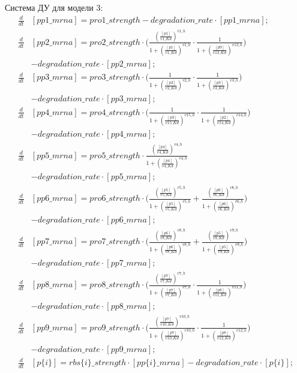 Система ДУ для модели 3:
\[ \begin{aligned}
  \frac{d}{dt}&[pp1\_mrna] = pro1\_strength - degradation\_rate \cdot [pp1\_mrna]; \\
  \frac{d}{dt}&[pp2\_mrna] = pro2\_strength \cdot 
    \biggl(\frac{(\frac{[p1]}{v1\_Kd})^{v1\_h}}{1+(\frac{[p1]}{v1\_Kd})^{v1\_h}} 
    \cdot \frac{1}{1+(\frac{[p9]}{v13\_Kd})^{v13\_h}}\biggr) \\
    & - degradation\_rate \cdot [pp2\_mrna]; \\
  \frac{d}{dt}&[pp3\_mrna] = pro3\_strength \cdot 
    \biggl(\frac{1}{1+(\frac{[p2]}{v2\_Kd})^{v2\_h}} 
    \cdot \frac{1}{1+(\frac{[p3]}{v3\_Kd})^{v3\_h}}\biggr) \\
    & - degradation\_rate \cdot [pp3\_mrna]; \\
  \frac{d}{dt}&[pp4\_mrna] = pro4\_strength \cdot 
    \biggl(\frac{1}{1+(\frac{[p3]}{v15\_Kd})^{v15\_h}} 
    \cdot \frac{1}{1+(\frac{[p2]}{v14\_Kd})^{v14\_h}}\biggr) \\
    & - degradation\_rate \cdot [pp4\_mrna]; \\
  \frac{d}{dt}&[pp5\_mrna] = pro5\_strength 
    \cdot \frac{(\frac{[p4]}{v4\_Kd})^{v4\_h}}{1+(\frac{[p4]}{v4\_Kd})^{v4\_h}} \\
    & - degradation\_rate \cdot [pp5\_mrna]; \\
  \frac{d}{dt}&[pp6\_mrna] = pro6\_strength \cdot 
    \biggl(\frac{(\frac{[p5]}{v5\_Kd})^{v5\_h}}{1+(\frac{[p5]}{v5\_Kd})^{v5\_h}} + 
    \frac{(\frac{[p6]}{v6\_Kd})^{v6\_h}}{1+(\frac{[p6]}{v6\_Kd})^{v6\_h}}\biggr) \\
    & - degradation\_rate \cdot [pp6\_mrna]; \\
  \frac{d}{dt}&[pp7\_mrna] = pro7\_strength \cdot 
    \biggl(\frac{(\frac{[p6]}{v8\_Kd})^{v8\_h}}{1+(\frac{[p6]}{v8\_Kd})^{v8\_h}} + 
    \frac{(\frac{[p5]}{v9\_Kd})^{v9\_h}}{1+(\frac{[p5]}{v9\_Kd})^{v9\_h}}\biggr) \\
    & - degradation\_rate \cdot [pp7\_mrna]; \\
  \frac{d}{dt}&[pp8\_mrna] = pro8\_strength \cdot 
    \biggl(\frac{(\frac{[p7]}{v7\_Kd})^{v7\_h}}{1+(\frac{[p7]}{v7\_Kd})^{v7\_h}} 
    \cdot \frac{1}{1+(\frac{[p8]}{v11\_Kd})^{v11\_h}}\biggr) \\
    & - degradation\_rate \cdot [pp8\_mrna]; \\
  \frac{d}{dt}&[pp9\_mrna] = pro9\_strength \cdot 
    \biggl(\frac{(\frac{[p7]}{v10\_Kd})^{v10\_h}}{1+(\frac{[p7]}{v10\_Kd})^{v10\_h}} 
    \cdot \frac{1}{1+(\frac{[p8]}{v12\_Kd})^{v12\_h}}\biggr) \\
    & - degradation\_rate \cdot [pp9\_mrna]; \\
  \frac{d}{dt}&[p\{i\}] = rbs\{i\}\_strength \cdot [pp\{i\}\_mrna] - degradation\_rate \cdot [p\{i\}]; \\
\end{aligned} \]

